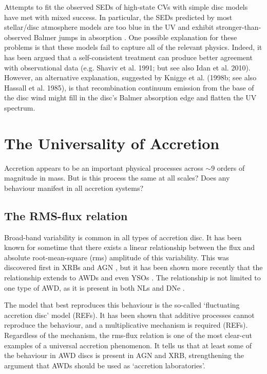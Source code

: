 Attempts to fit the observed SEDs of high-state CVs with simple disc models have met with mixed success. In
particular, the SEDs predicted by most stellar/disc atmosphere models 
are too blue in the UV \citep{wade1988,long1991,long1994,knigge1998} and exhibit
stronger-than-observed Balmer jumps in absorption 
\citep{wade1984,haug1987,ladous1989b,knigge1998}. One possible
explanation for these problems is that these models fail to capture
all of the relevant physics. Indeed, it has been argued that a
self-consistent treatment can produce better agreement with 
observational data (e.g. Shaviv et al. 1991;  but see also Idan et al. 2010).
\nocite{idanshaviv2010} \nocite{shaviv1991}
However, an alternative explanation, suggested by Knigge et al.
(1998b; see also Hassall et al. 1985)\nocite{KLWB98,hassall}, 
is that recombination continuum emission from the base of the 
disc wind might fill in the disc's Balmer absorption edge and flatten the UV spectrum.








\section{The Universality of Accretion}

Accretion appears to be an important physical processes across $\sim9$ orders
of magnitude in mass. But is this process the same at all scales? Does any 
behaviour manifest in all accretion systems? 

\subsection{The RMS-flux relation}

Broad-band variability is common in all types of accretion disc. It has been
known for sometime that there exists a linear relationship
between the flux and absolute root-mean-square (rms) amplitude
of this variability. This was discovered first in XRBs and AGN 
\citep{uttley2001, uttley2005, heil2012}, but it has been shown
more recently that the relationship extends to AWDs and even YSOs 
\citep{scaringi2012,scaringi2015a}. The relationship is not limited
to one type of AWD, as it is present in both NLs and DNe \citep{vandesande2015}.
 
The model that best reproduces this behaviour is the so-called
`fluctuating accretion disc' model (REFs). It has been shown that 
additive processes cannot reproduce the behaviour, and a multiplicative
mechanism is required (REFs). 
Regardless of the mechanism, the rms-flux relation is one of the most
clear-cut examples of a universal accretion phenomenon. 
It tells us that at least some of the behaviour in AWD discs
is present in AGN and XRB, strengthening the argument that AWDs
should be used as `accretion laboratories'. 


